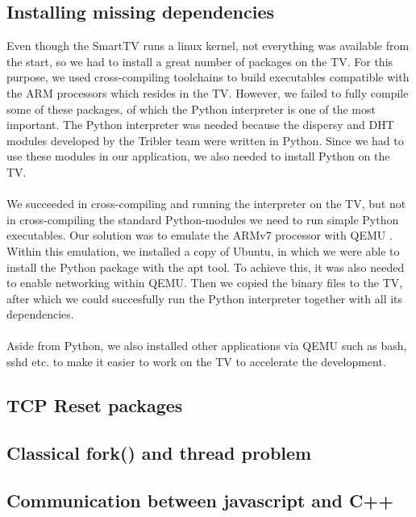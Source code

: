\subsection{Installing missing dependencies}
Even though the SmartTV runs a linux kernel, not everything was available from the start, so we had to install a great number of packages on the TV.
For this purpose, we used cross-compiling toolchains to build executables compatible with the ARM \cite{arm} processors which resides in the TV. However, we failed
to fully compile some of these packages, of which the Python interpreter is one of the most important. The Python interpreter was needed because the dispersy and DHT modules 
developed by the Tribler team were written in Python. Since we had to use these modules in our application, we also needed to install Python on the TV. 
\\\\
We succeeded in cross-compiling and running the interpreter on the TV, but not in cross-compiling the standard Python-modules we need to run simple Python executables.
Our solution was to emulate the ARMv7 processor with QEMU \cite{qemu}. Within this emulation, we installed a copy of Ubuntu, \cite{ubuntu} in which we were able to install the Python package with the apt tool.
To achieve this, it was also needed to enable networking within QEMU. \cite{qemu-network} Then we copied the binary files to the TV, after which we could succesfully run the Python interpreter together with all its dependencies.
\\\\
Aside from Python, we also installed other applications via QEMU such as bash, sshd etc. to make it easier to work on the TV to accelerate the development.

\subsection{TCP Reset packages}

\subsection{Classical fork() and thread problem}

\subsection{Communication between javascript and C++}

